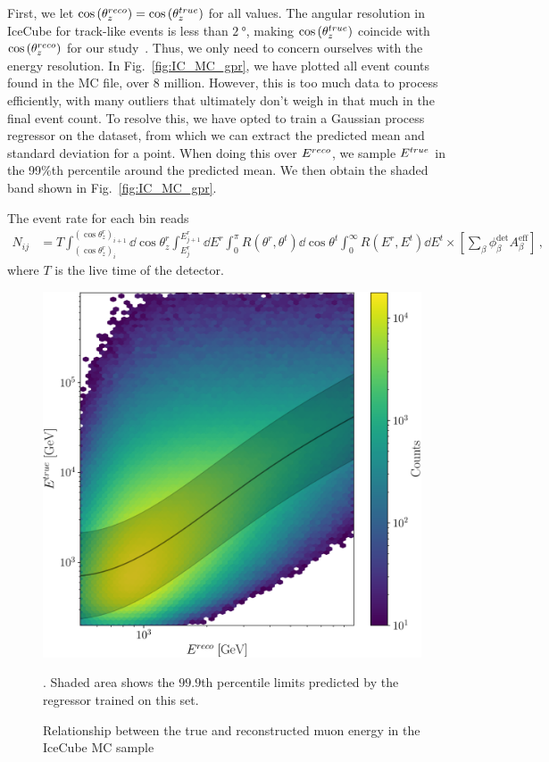 \documentclass{thesis}
\begin{document}
First, we let $\cos{(\theta_z^{reco})} = \cos{(\theta_z^{true})}$ for all values. The angular resolution in IceCube for track-like events is less than $\SI{2}{\degree}$, making $\cos{(\theta_z^{true})}$ coincide with $\cos{(\theta_z^{reco})}$ for our study~\cite{IC2020}.
Thus, we only need to concern ourselves with the energy resolution.
In Fig.~\ref{fig:IC_MC_gpr}, we have plotted all event counts found in the MC file, over 8 million. However, this is too much data to process efficiently, with many outliers that ultimately don't weigh in 
that much in the final event count. To resolve this, we have opted to train a Gaussian process regressor on the dataset, from which we can extract the predicted mean and standard deviation for a point.
When doing this over $E^{reco}$, we sample $E^{true}$ in the 99\%th percentile around the predicted mean. We then obtain the shaded band shown in Fig.~\ref{fig:IC_MC_gpr}. %

The event rate for each bin reads
\begin{align}\label{eq:ICevents}
    N_{ij} &= T \int_{(\cos{\theta_z^r})_i}^{(\cos{\theta_z^r})_{i+1}} \dd \cos{\theta^r_z} \int_{E^r_{j}}^{E^r_{j+1}} \dd E^r \int_0^\pi R(\theta^r,\theta^t) \dd \cos{\theta^t} \int_0^\infty R(E^r,E^t) \dd E^t
    \times \left[ \sum_\beta \phi_\beta^\text{det}  A^\text{eff}_\beta\right]\,,
\end{align}
where $T$ is the live time of the detector.

\begin{figure}[!tb]\label{fig:IC_MC_gpr}
    \begin{center}
       \includegraphics[width=0.4\linewidth]{figures/IC_MC_gpr.pdf} %
    \end{center}
    \caption{Relationship between the true and reconstructed muon energy in the IceCube MC sample~\cite{IC2016}}\label{fig:IC_MC_counts}. Shaded area shows the $99.9$th percentile limits predicted by the regressor trained on this set.
 \end{figure}


\end{document}
